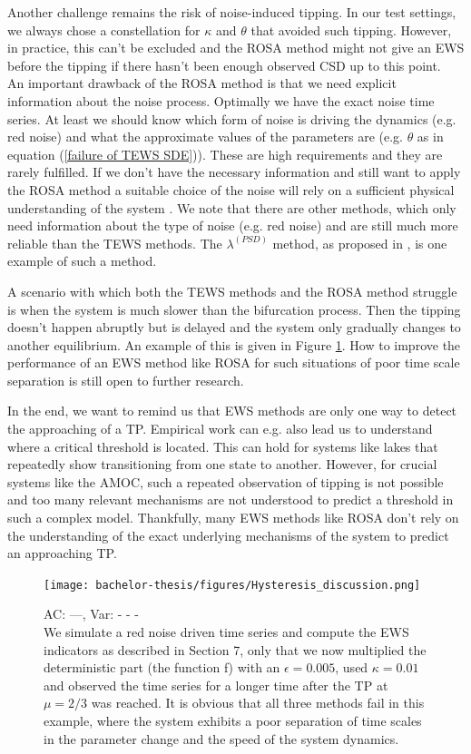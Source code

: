\documentclass[%
thesis=student,%
coverpage=false,%
titlepage=false,%
headmarks=true, %
english,%
font=libertine, %
math=newpxtx, %
BCOR=5mm,%
coverBCOR=11mm%
]{tumbook}
\begin{document}
Another challenge remains the risk of noise-induced tipping. In our test settings, we always chose a constellation for $\kappa$ and $\theta$ that avoided such tipping. However, in practice, this can't be excluded and the ROSA method might not give an EWS before the tipping if there hasn't been enough observed CSD up to this point. \\
An important drawback of the ROSA method is that we need explicit information about the noise process. Optimally we have the exact noise time series. At least we should know which form of noise is driving the dynamics (e.g. red noise) and what the approximate values of the parameters are (e.g. $\theta$ as in 
equation (\ref{failure of TEWS SDE})). These are high requirements and they are rarely fulfilled. If we don't have the necessary information and still want to apply the ROSA method a suitable choice of the noise will rely on a sufficient physical understanding of the system \cite{Morr:2024}. We note that there are other methods, which only need information about the type of noise (e.g. red noise) and are still much more reliable than the TEWS methods. The $\lambda^{(PSD)}$ method, as proposed in \cite{Morr:2024}, is one example of such a method.

A scenario with which both the TEWS methods and the ROSA method struggle is when the system is much slower than the bifurcation process. Then the tipping doesn't happen abruptly but is delayed and the system only gradually changes to another equilibrium. An example of this is given in Figure \ref{hysteresis_discussion}. How to improve the performance of an EWS method like ROSA for such situations of poor time scale separation is still open to further research.

In the end, we want to remind us that EWS methods are only one way to detect the approaching of a TP. Empirical work can e.g. also lead us to understand where a critical threshold is located. This can hold for systems like lakes that repeatedly show transitioning from one state to another. However, for crucial systems like the AMOC, such a repeated observation of tipping is not possible and too many relevant mechanisms are not understood to predict a threshold in such a complex model. Thankfully, many EWS methods like ROSA don't rely on the understanding of the exact underlying mechanisms of the system to predict an approaching TP.



\begin{figure}
    \centering
    \texttt{[image: bachelor-thesis/figures/Hysteresis\_discussion.png]}
    \caption{AC: ---, Var: - - - \\
    We simulate a red noise driven time series and compute the EWS indicators as described in Section 7, only that we now multiplied the deterministic part (the function f) with an $\epsilon = 0.005$, used $\kappa = 0.01$ and observed the time series for a longer time after the TP at $\mu = 2/3$ was reached. It is obvious that all three methods fail in this example, where the system exhibits a poor separation of time scales in the parameter change and the speed of the system dynamics.
    }
    \label{hysteresis_discussion}
\end{figure}
\end{document}
